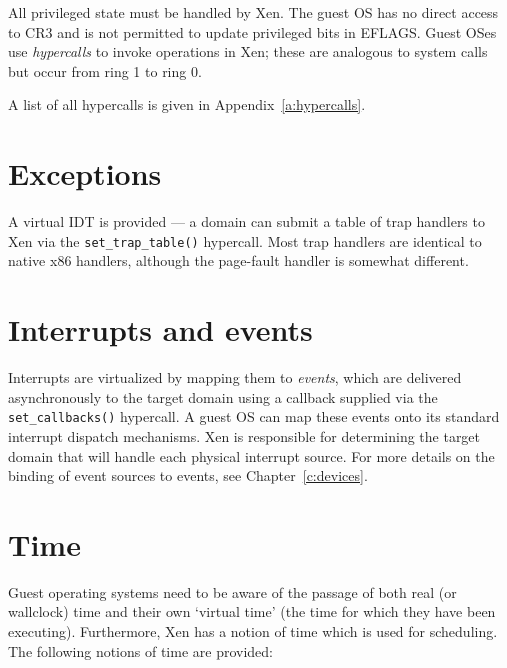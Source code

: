 \documentclass[11pt,twoside,final,openright]{xenstyle}
\begin{document}
All privileged state must be handled by Xen.  The guest OS has no
direct access to CR3 and is not permitted to update privileged bits in
EFLAGS. Guest OSes use \emph{hypercalls} to invoke operations in Xen; 
these are analogous to system calls but occur from ring 1 to ring 0. 

A list of all hypercalls is given in Appendix~\ref{a:hypercalls}. 



\section{Exceptions}

A virtual IDT is provided --- a domain can submit a table of trap
handlers to Xen via the {\tt set\_trap\_table()} hypercall.  Most trap
handlers are identical to native x86 handlers, although the page-fault
handler is somewhat different.


\section{Interrupts and events}

Interrupts are virtualized by mapping them to \emph{events}, which are
delivered asynchronously to the target domain using a callback
supplied via the {\tt set\_callbacks()} hypercall.  A guest OS can map
these events onto its standard interrupt dispatch mechanisms.  Xen is
responsible for determining the target domain that will handle each
physical interrupt source. For more details on the binding of event
sources to events, see Chapter~\ref{c:devices}. 



\section{Time}

Guest operating systems need to be aware of the passage of both real
(or wallclock) time and their own `virtual time' (the time for
which they have been executing). Furthermore, Xen has a notion of 
time which is used for scheduling. The following notions of 
time are provided: 
\end{document}
